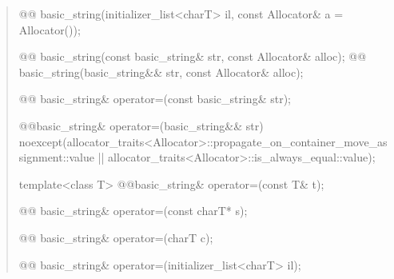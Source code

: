 \documentclass{wg21}
\begin{document}
\begin{quote}
\begin{itemdecl}
@@ basic_string(initializer_list<charT> il, const Allocator& a = Allocator());
\end{itemdecl}

\begin{itemdecl}
@@ basic_string(const basic_string& str, const Allocator& alloc);
@@ basic_string(basic_string&& str, const Allocator& alloc);
\end{itemdecl}

\begin{itemdecl}
@@ basic_string& operator=(const basic_string& str);
\end{itemdecl}

\begin{itemdecl}
@@basic_string& operator=(basic_string&& str)
  noexcept(allocator_traits<Allocator>::propagate_on_container_move_assignment::value ||
           allocator_traits<Allocator>::is_always_equal::value);
\end{itemdecl}

\begin{itemdecl}
template<class T>
  @@basic_string& operator=(const T& t);
\end{itemdecl}

\begin{itemdecl}
@@ basic_string& operator=(const charT* s);
\end{itemdecl}

\begin{itemdecl}
@@ basic_string& operator=(charT c);
\end{itemdecl}

\begin{itemdecl}
@@ basic_string& operator=(initializer_list<charT> il);
\end{itemdecl}
\end{quote}
\end{document}
